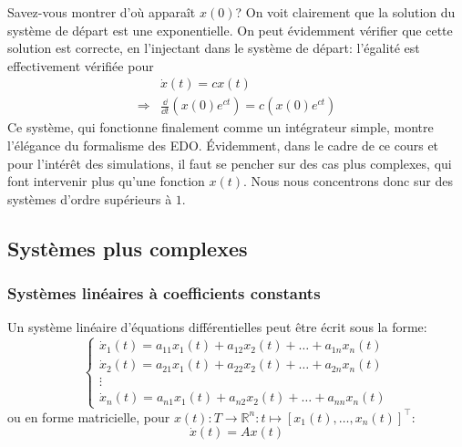                 Savez-vous montrer d'où apparaît $x(0)$? On voit clairement que la solution du système de départ est une exponentielle. On peut évidemment vérifier que cette solution est correcte, en l'injectant dans le système de départ: l'égalité est effectivement vérifiée pour
                \begin{equation}
                    \begin{split}
                        &\dot{x}(t) = c x(t)\\
                        \Rightarrow& \frac{\dd}{\dd t} (x(0) e^{ct}) = c (x(0) e^{ct})
                    \end{split}
                \end{equation}
                Ce système, qui fonctionne finalement comme un intégrateur simple, montre l'élégance du formalisme des EDO. Évidemment, dans le cadre de ce cours et pour l'intérêt des simulations, il faut se pencher sur des cas plus complexes, qui font intervenir plus qu'une fonction $x(t)$. Nous nous concentrons donc sur des systèmes d'ordre supérieurs à $1$.

        \subsection{Systèmes plus complexes}
            \subsubsection{Systèmes linéaires à coefficients constants}
                Un système linéaire d'équations différentielles peut être écrit sous la forme:
                \begin{equation}
                    \begin{cases}
                    \dot{x}_1(t)=a_{11}x_1(t) + a_{12}x_2(t) + \dots + a_{1n}x_n(t) \\
                    \dot{x}_2(t)=a_{21}x_1(t) + a_{22}x_2(t) + \dots + a_{2n}x_n(t) \\
                    \vdots \\
                    \dot{x}_n(t)=a_{n1}x_1(t) + a_{n2}x_2(t) + \dots + a_{nn}x_n(t)
                    \end{cases}
                \end{equation}
                ou en forme matricielle, pour $x(t) : T \to \mathbb R^n : t \mapsto [x_1(t), \ldots, x_n(t)]^\top$:
                \begin{equation}
                    \dot{x}(t)=A x(t)
                \end{equation}
        
